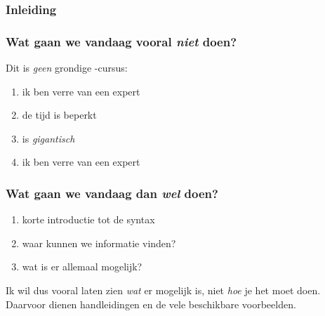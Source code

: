 \begin{frame}
  \frametitle{Inleiding}
\end{frame}

\begin{frame}
  \frametitle{Wat gaan we vandaag vooral \emph{niet} doen?}

  Dit is \emph{geen} grondige \TikZ-cursus:
  \begin{enumerate}
    \item ik ben verre van een expert
    \item de tijd is beperkt
    \item \TikZ is \emph{gigantisch}
    \item\pause ik ben verre van een expert
  \end{enumerate}
\end{frame}

\begin{frame}
  \frametitle{Wat gaan we vandaag dan \emph{wel} doen?}

  \begin{enumerate}
    \item korte introductie tot de syntax
    \item waar kunnen we informatie vinden?
    \item wat is er allemaal mogelijk?
  \end{enumerate}
  Ik wil dus vooral laten zien \emph{wat} er mogelijk is, niet \emph{hoe} je het moet doen. Daarvoor dienen handleidingen en de vele beschikbare voorbeelden.
\end{frame}

